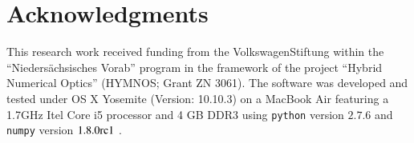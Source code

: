 \documentclass[5p,times,twocolumn]{elsarticle}
\begin{document}
\section*{Acknowledgments}
This research work received funding from the VolkswagenStiftung within the
``Nieders\"achsisches Vorab'' program in the framework of the project ``Hybrid
Numerical Optics''  (HYMNOS; Grant ZN 3061). The software was developed and
tested under OS X Yosemite (Version: 10.10.3) on a MacBook Air featuring a
1.7GHz Itel Core i5 processor and 4 GB DDR3 using {\tt{python}}
\cite{Oliphant:2007} version $2.7.6$ and {\tt{numpy}} version $1.8.0{\rm{rc}}1$
\cite{Jones:2001}. 


\end{document}
